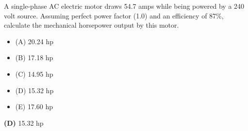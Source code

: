

A single-phase AC electric motor draws 54.7 amps while being powered by a 240 volt source.  Assuming perfect power factor (1.0) and an efficiency of 87\%, calculate the mechanical horsepower output by this motor.

\begin{itemize}
\item{(A)} 20.24 hp
\vskip 5pt 
\item{(B)} 17.18 hp
\vskip 5pt 
\item{(C)} 14.95 hp
\vskip 5pt 
\item{(D)} 15.32 hp
\vskip 5pt 
\item{(E)} 17.60 hp
\end{itemize}







{\bf (D)} 15.32 hp











